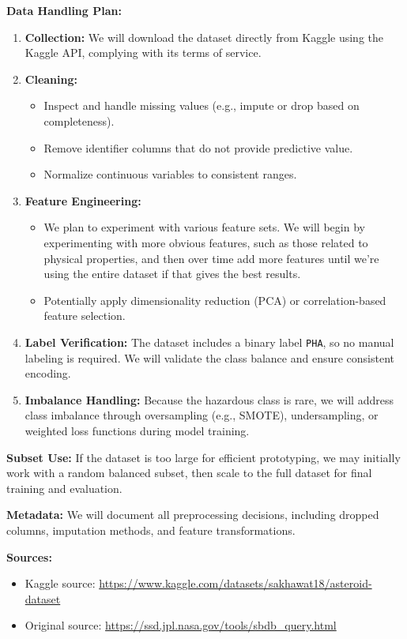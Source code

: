 \documentclass{article}
\begin{document}
\textbf{Data Handling Plan:}
\begin{enumerate}
    \item \textbf{Collection:} We will download the dataset directly from Kaggle using the Kaggle API, complying with its terms of service.
    \item \textbf{Cleaning:}
    \begin{itemize}
        \item Inspect and handle missing values (e.g., impute or drop based on completeness).
        \item Remove identifier columns that do not provide predictive value.
        \item Normalize continuous variables to consistent ranges.
    \end{itemize}
    \item \textbf{Feature Engineering:}
    \begin{itemize}
        \item We plan to experiment with various feature sets. We will begin by experimenting with more obvious features, such as those related to physical properties, and then over time add more features until we're using the entire dataset if that gives the best results.
        \item Potentially apply dimensionality reduction (PCA) or correlation-based feature selection.
    \end{itemize}
    \item \textbf{Label Verification:}
    The dataset includes a binary label \texttt{PHA}, so no manual labeling is required. We will validate the class balance and ensure consistent encoding.
    \item \textbf{Imbalance Handling:}
    Because the hazardous class is rare, we will address class imbalance through oversampling (e.g., SMOTE), undersampling, or weighted loss functions during model training.
\end{enumerate}

\textbf{Subset Use:}
If the dataset is too large for efficient prototyping, we may initially work with a random balanced subset, then scale to the full dataset for final training and evaluation. \newline

\textbf{Metadata:}
We will document all preprocessing decisions, including dropped columns, imputation methods, and feature transformations. \newline

\textbf{Sources:}
\begin{itemize}
    \item Kaggle source: \url{https://www.kaggle.com/datasets/sakhawat18/asteroid-dataset}
    \item Original source: \url{https://ssd.jpl.nasa.gov/tools/sbdb_query.html}
\end{itemize}
\end{document}
